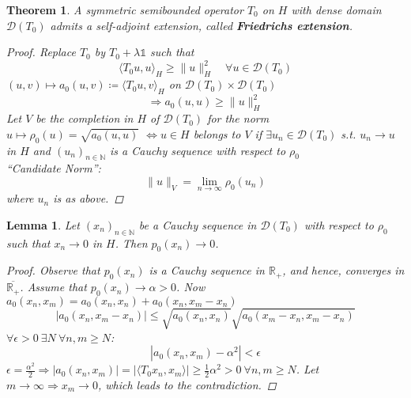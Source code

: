 \documentclass[12pt]{extreport} %
\newcommand{\N}{\mathbb{N}}
\newcommand{\R}{\mathbb{R}}
\newcommand{\DO}[1]{\mathcal{D}\left( {#1} \right)}
\theoremstyle{named}
\theoremstyle{nnamed}
\theoremstyle{itshape}
\newtheorem{theorem}{Theorem}  \counterwithin{theorem}{chapter}
\newtheorem{lemma}{Lemma}  \counterwithin{lemma}{chapter}
\theoremstyle{normal}
\begin{document}
\begin{theorem}
	A symmetric semibounded operator $T_0$ on $H$ with dense domain $\DO{T_0}$ admits a self-adjoint extension, called \textbf{Friedrichs extension}.
	
	\begin{proof}
		Replace $T_0$ by $T_0 + \lambda \mathds{1}$ such that
		$$ \langle T_0 u, u \rangle_H \geq \|u\|_H^2 \quad \forall u \in \DO{T_0} $$
		$(u,v) \mapsto a_0(u,v) \coloneqq \langle T_0 u, v \rangle_H$ on $\DO{T_0} \times \DO{T_0}$
		$$ \Rightarrow a_0(u,u) \geq \| u \|^2_H $$
		Let $V$ be the completion in $H$ of $\DO{T_0}$ for the norm $u \mapsto \rho_0(u) = \sqrt{a_0(u,u)}$
		$\iff u \in H$ belongs to $V$ if $\exists u_n \in \DO{T_0}$ s.t. $u_n \rightarrow u$ in $H $ and $ (u_n)_{n \in \N}$ is a Cauchy sequence with respect to $\rho_0$ ~\\
		
		\enquote{Candidate Norm}:
		$$ \| u \|_V = \lim_{n \rightarrow \infty} \rho_0(u_n) $$
		where $u_n$ is as above.
	\end{proof}
\end{theorem}

\begin{lemma}
	Let $(x_n)_{n \in \N}$ be a Cauchy sequence in $\DO{T_0}$  with respect to $\rho_0$ such that $x_n \rightarrow 0 $ in $H$. Then $p_0(x_n) \rightarrow 0$. 
	
	\begin{proof}
		Observe that $p_0(x_n)$ is a Cauchy sequence in $\R_+$, and hence, converges in $\overline{\R_+}$. Assume that  $p_0(x_n) \rightarrow \alpha > 0$. Now $a_0(x_n, x_m) = a_0(x_n, x_n) + a_0(x_n, x_m - x_n)$
		$$ \left| a_0(x_n, x_m - x_n) \right| \leq \sqrt{a_0(x_n, x_n)} \sqrt{a_0(x_m - x_n, x_m - x_n)} $$
		$\forall \epsilon > 0 ~\exists N ~\forall n, m \geq N$:
		$$ \left| a_0(x_n, x_m) - \alpha^2 \right| < \epsilon $$
		$\epsilon = \frac{\alpha^2}{2} \Rightarrow |a_0(x_n, x_m) | = \left| \langle T_0 x_n, x_m \rangle \right| \geq \frac{1}{2} \alpha^2 > 0 ~\forall n, m \geq N$. Let $m \rightarrow \infty \Rightarrow x_m \rightarrow 0$, which leads to the contradiction.
	\end{proof}
\end{lemma} %
\end{document}
